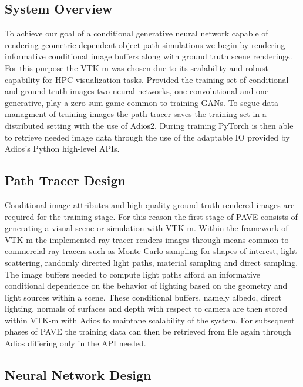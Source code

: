 \documentclass[sigconf,authordraft]{acmart}
\begin{document}
\subsection{System Overview}
 
To achieve our goal of a conditional generative neural network capable of rendering geometric dependent object path simulations we begin by rendering informative conditional image buffers along with ground truth scene renderings. For this purpose the VTK-m was chosen due to its scalability and robust capability for HPC visualization tasks. Provided the training set of conditional and ground truth images two neural networks, one convolutional and one generative, play a zero-sum game common to training GANs. To segue data managment of training images the path tracer saves the training set in a distributed setting with the use of Adios2. During training PyTorch is then able to retrieve needed image data through the use of the adaptable IO provided by Adios's Python high-level APIs.

\subsection{Path Tracer Design}

Conditional image attributes and high quality ground truth rendered images are required for the training stage. For this reason the first stage of PAVE consists of generating a visual scene or simulation with VTK-m. Within the framework of VTK-m the implemented ray tracer renders images through means common to commercial ray tracers such as Monte Carlo sampling for shapes of interest, light scattering, randomly directed light paths, material sampling and direct sampling. The image buffers needed to compute light paths afford an informative conditional dependence on the behavior of lighting based on the geometry and light sources within a scene. These conditional buffers, namely albedo, direct lighting, normals of surfaces and depth with respect to camera are then stored within VTK-m with Adios to maintane scalability of the system. For subsequent phases of PAVE the training data can then be retrieved from file again through Adios differing only in the API needed. 

\subsection{Neural Network Design}
\end{document}

